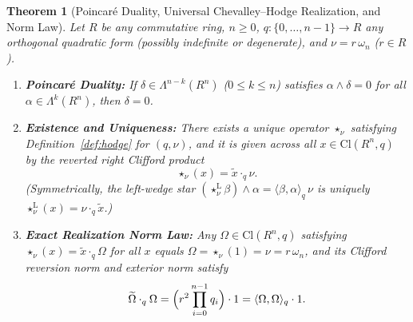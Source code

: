 \documentclass[11pt]{article}
\newtheorem{theorem}{Theorem}[section]
\theoremstyle{definition}
\newcommand{\Cl}{\mathrm{Cl}}
\begin{document}
\begin{theorem}[Poincar\'e Duality, Universal Chevalley--Hodge Realization, and Norm Law]\label{thm:chevalley-hodge}
Let $R$ be any commutative ring, $n \ge 0$, $q : \{0,\dots,n-1\} \to R$ any orthogonal quadratic form (possibly indefinite or degenerate), and $\nu = r\,\omega_n$ ($r \in R$).
\begin{enumerate}
  \item[(1)] \textbf{Poincar\'e Duality:} If $\delta \in \Lambda^{n-k}(R^n)$ ($0 \le k \le n$) satisfies $\alpha \wedge \delta = 0$ for all $\alpha \in \Lambda^k(R^n)$, then $\delta = 0$.
  \item[(2)] \textbf{Existence and Uniqueness:} There exists a unique operator $\star_\nu$ satisfying Definition~\ref{def:hodge} for $(q, \nu)$, and it is given across all $x \in \Cl(R^n, q)$ by the reverted right Clifford product
  \begin{equation}\label{eq:rev-star}
    \star_\nu(x) = \widetilde{x}\cdot_q \nu.
  \end{equation}
  (Symmetrically, the left-wedge star $(\star_\nu^{\mathrm{L}}\beta)\wedge\alpha = \langle\beta,\alpha\rangle_q\,\nu$ is uniquely $\star_\nu^{\mathrm{L}}(x) = \nu\cdot_q\widetilde{x}$.)
  \item[(3)] \textbf{Exact Realization Norm Law:} Any $\Omega \in \Cl(R^n, q)$ satisfying $\star_\nu(x) = \widetilde{x}\cdot_q \Omega$ for all $x$ equals $\Omega = \star_\nu(1) = \nu = r\,\omega_n$, and its Clifford reversion norm and exterior norm satisfy
  \begin{equation}\label{eq:norm-law}
    \widetilde{\Omega}\cdot_q \Omega = \Bigl(r^2 \prod_{i=0}^{n-1} q_i\Bigr)\cdot 1 = \langle \Omega, \Omega \rangle_q \cdot 1.
  \end{equation}
\end{enumerate}
\end{theorem}
\end{document}
